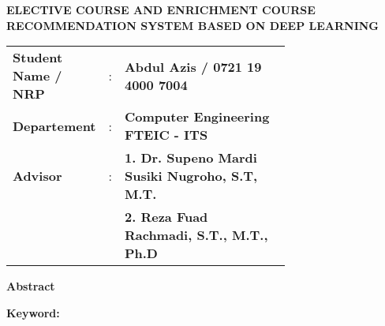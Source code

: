 \begin{center}
    \uppercase{\textbf{\large Elective Course and Enrichment course recommendation system based on Deep Learning}}
\end{center}

\vspace*{6 mm}
\begin{adjustwidth}{}{}
    \begin{tabular}{lcp{0.7\linewidth}}

        \noindent\textbf{Student Name / NRP} & : & \textbf{Abdul Azis / 0721 19 4000 7004}                \\
        \noindent\textbf{Departement}        & : & \textbf{Computer Engineering FTEIC - ITS}              \\
        \noindent\textbf{Advisor}            & : & \textbf{1. Dr. Supeno Mardi Susiki Nugroho, S.T, M.T.} \\
                                             &   & \textbf{2. Reza Fuad Rachmadi, S.T., M.T., Ph.D}       \\
    \end{tabular}
\end{adjustwidth}

\vspace{6 mm}
\noindent
\textbf{Abstract}
\vspace{3 mm}

\lipsum[2-4]

\vspace{6 mm}
\noindent
\textbf{Keyword: }




